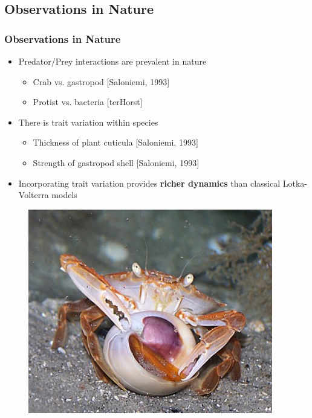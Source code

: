 \documentclass[10pt]{beamer}
\begin{document}
\subsection{Observations in Nature}
\begin{frame}
	\frametitle{Observations in Nature}
	\begin{minipage}{0.65\textwidth}
		\begin{itemize}
			\item Predator/Prey interactions are prevalent in nature
			\begin{itemize}
				\item Crab vs. gastropod {\tiny[Saloniemi, 1993]}
				\item Protist vs. bacteria {\tiny[terHorst]}
			\end{itemize}
			\item There is trait variation within species
			\begin{itemize}
				\item Thickness of plant cuticula {\tiny[Saloniemi, 1993]}
				\item Strength of gastropod shell {\tiny[Saloniemi, 1993]}
			\end{itemize}
			\item Incorporating trait variation provides {\bf richer dynamics} than classical Lotka-Volterra models
		\end{itemize}
	\end{minipage}
	\begin{minipage}{0.25\textwidth}
		\begin{figure}
			\includegraphics[width=0.95\textwidth]{figures/crab_eating_gastropod.jpg}
		\end{figure}
	\end{minipage}
\end{frame}
\end{document}
